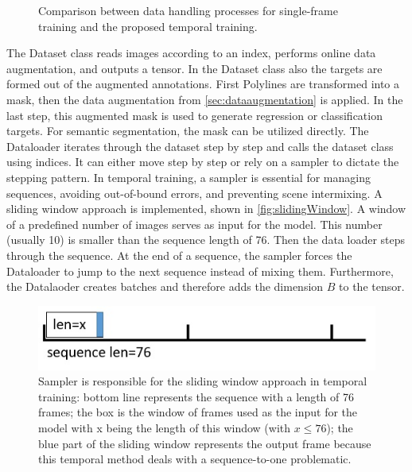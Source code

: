 \begin{figure}[H]
    \caption{Comparison between data handling processes for single-frame training and the proposed temporal training.}
    \label{fig:dataHandlingProcess}
\end{figure}

The Dataset class reads images according to an index, performs online data augmentation, and outputs a tensor.
In the Dataset class also the targets are formed out of the augmented annotations.
First Polylines are transformed into a mask, then the data augmentation from \autoref{sec:dataaugmentation} is applied.
In the last step, this augmented mask is used to generate regression or classification targets.
For semantic segmentation, the mask can be utilized directly.
The Dataloader iterates through the dataset step by step and calls the dataset class using indices.
It can either move step by step or rely on a sampler to dictate the stepping pattern.
In temporal training, a sampler is essential for managing sequences, avoiding out-of-bound errors, and preventing scene intermixing.
A sliding window approach is implemented, shown in \autoref{fig:slidingWindow}.
A window of a predefined number of images serves as input for the model.
This number (usually 10) is smaller than the sequence length of 76.
Then the data loader steps through the sequence.
At the end of a sequence, the sampler forces the Dataloader to jump to the next sequence instead of mixing them.
Furthermore, the Datalaoder creates batches and therefore adds the dimension $B$ to the tensor.

\begin{figure}[H]
    \centering
    \includegraphics[width=0.5\linewidth]{PICs/usedDatasets/slidingWindow.jpg}
    \caption{Sampler is responsible for the sliding window approach in temporal training: bottom line represents the sequence with a length of 76 frames; the box is the window of frames used as the input for the model with x being the length of this window (with $x \leq 76$); the blue part of the sliding window represents the output frame because this temporal method deals with a sequence-to-one problematic.}
    \label{fig:slidingWindow}
\end{figure}

